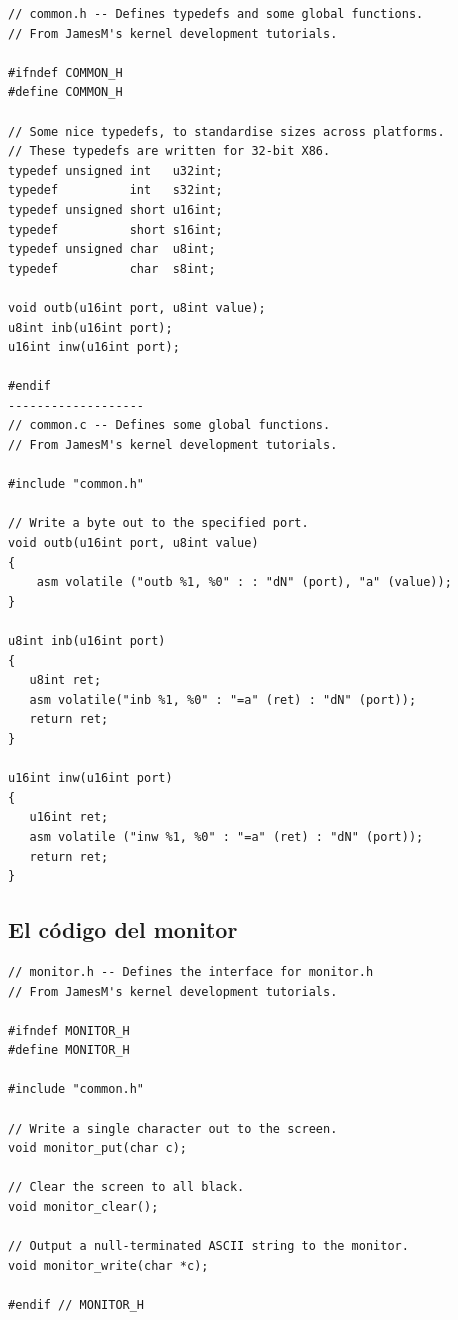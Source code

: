 \documentclass{report}
\begin{document}
\begin{lstlisting}
// common.h -- Defines typedefs and some global functions.
// From JamesM's kernel development tutorials.

#ifndef COMMON_H
#define COMMON_H

// Some nice typedefs, to standardise sizes across platforms.
// These typedefs are written for 32-bit X86.
typedef unsigned int   u32int;
typedef          int   s32int;
typedef unsigned short u16int;
typedef          short s16int;
typedef unsigned char  u8int;
typedef          char  s8int;

void outb(u16int port, u8int value);
u8int inb(u16int port);
u16int inw(u16int port);

#endif
-------------------
// common.c -- Defines some global functions.
// From JamesM's kernel development tutorials.

#include "common.h"

// Write a byte out to the specified port.
void outb(u16int port, u8int value)
{
    asm volatile ("outb %1, %0" : : "dN" (port), "a" (value));
}

u8int inb(u16int port)
{
   u8int ret;
   asm volatile("inb %1, %0" : "=a" (ret) : "dN" (port));
   return ret;
}

u16int inw(u16int port)
{
   u16int ret;
   asm volatile ("inw %1, %0" : "=a" (ret) : "dN" (port));
   return ret;
}

\end{lstlisting}

\subsection{El c\'odigo del monitor}

\begin{lstlisting}
// monitor.h -- Defines the interface for monitor.h
// From JamesM's kernel development tutorials.

#ifndef MONITOR_H
#define MONITOR_H

#include "common.h"

// Write a single character out to the screen.
void monitor_put(char c);

// Clear the screen to all black.
void monitor_clear();

// Output a null-terminated ASCII string to the monitor.
void monitor_write(char *c);

#endif // MONITOR_H

\end{lstlisting}
\end{document}
